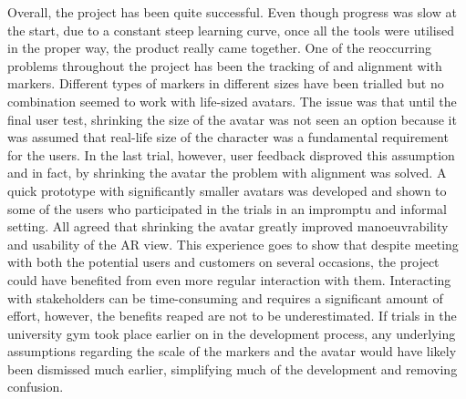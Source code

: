 \documentclass{l4proj}
\begin{document}
Overall, the project has been quite successful. Even though progress was slow at the start, due to a constant steep learning curve, once all the tools were utilised in the proper way, the product really came together. One of the reoccurring problems throughout the project has been the tracking of and alignment with markers. Different types of markers in different sizes have been trialled but no combination seemed to work with life-sized avatars. The issue was that until the final user test, shrinking the size of the avatar was not seen an option because it was assumed that real-life size of the character was a fundamental requirement for the users. In the last trial, however, user feedback disproved this assumption and in fact, by shrinking the avatar the problem with alignment was solved. A quick prototype with significantly smaller avatars was developed and shown to some of the users who participated in the trials in an impromptu and informal setting. All agreed that shrinking the avatar greatly improved manoeuvrability and usability of the AR view. This experience goes to show that despite meeting with both the potential users and customers on several occasions, the project could have benefited from even more regular interaction with them. Interacting with stakeholders can be time-consuming and requires a significant amount of effort, however, the benefits reaped are not to be underestimated. If trials in the university gym took place earlier on in the development process, any underlying assumptions regarding the scale of the markers and the avatar would have likely been dismissed much earlier, simplifying much of the development and removing confusion.
\end{document}
